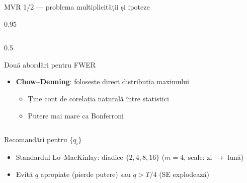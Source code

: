 \documentclass[9pt, aspectratio=169, t]{beamer}
\begin{document}
\begin{frame}[shrink=35]{MVR 1/2 --- problema multiplicității și ipoteze}
\begin{cminipage}{0.95\textwidth}
\begin{columns}[T]
\begin{column}{0.5\textwidth}
\begin{exampleblock}{Două abordări pentru FWER}
\begin{itemize}
    \item \textbf{Chow--Denning}: folosește direct distribuția maximului
    \begin{itemize}\setlength{\itemsep}{0pt}
        \item Ține cont de corelația naturală între statistici
        \item Putere mai mare ca Bonferroni
    \end{itemize}
\end{itemize}
\end{exampleblock}
\end{column}
\end{columns}
\begin{block}{Recomandări pentru $\{q_i\}$}
\footnotesize
\begin{itemize}\setlength{\itemsep}{0pt}
    \item Standardul Lo--MacKinlay: diadice $\{2, 4, 8, 16\}$ ($m=4$, scale: zi $\to$ lună)
    \item Evită $q$ apropiate (pierde putere) sau $q > T/4$ (SE explodează)
\end{itemize}
\end{block}
\end{cminipage}
\end{frame}
\end{document}
